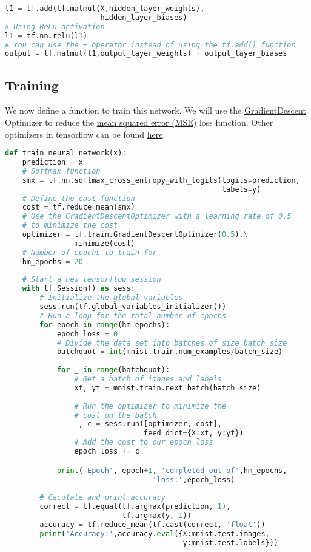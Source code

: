 \documentclass[Proceedings]{ascelike}
\begin{document}
\begin{lstlisting}[language=Python]
l1 = tf.add(tf.matmul(X,hidden_layer_weights), 
                      hidden_layer_biases)
# Using ReLu activation
l1 = tf.nn.relu(l1)
# You can use the + operator instead of using the tf.add() function
output = tf.matmul(l1,output_layer_weights) + output_layer_biases
\end{lstlisting}

\subsection{Training}
We now define a function to train this network. We will use the \href{https://en.wikipedia.org/wiki/Gradient_descent}{GradientDescent} Optimizer to reduce the \href{https://en.wikipedia.org/wiki/Mean_squared_error}{mean squared error (MSE)} loss function. Other optimizers in tensorflow can be found \href{https://www.tensorflow.org/api_guides/python/train#Optimizers}{here}.

\begin{lstlisting}[language=Python]
def train_neural_network(x):
    prediction = x
    # Softmax function
    smx = tf.nn.softmax_cross_entropy_with_logits(logits=prediction,
                                                  labels=y)
    # Define the cost function
    cost = tf.reduce_mean(smx)
    # Use the GradientDescentOptimizer with a learning rate of 0.5 
    # to minimize the cost
    optimizer = tf.train.GradientDescentOptimizer(0.5).\
                minimize(cost)
    # Number of epochs to train for
    hm_epochs = 20
    
    # Start a new tensorflow session
    with tf.Session() as sess:
        # Initialize the global variables
        sess.run(tf.global_variables_initializer())
        # Run a loop for the total number of epochs
        for epoch in range(hm_epochs):
            epoch_loss = 0
            # Divide the data set into batches of size batch_size
            batchquot = int(mnist.train.num_examples/batch_size)
            
            for _ in range(batchquot):
                # Get a batch of images and labels
                xt, yt = mnist.train.next_batch(batch_size)
                
                # Run the optimizer to minimize the 
                # cost on the batch
                _, c = sess.run([optimizer, cost], 
                                feed_dict={X:xt, y:yt})
                # Add the cost to our epoch loss
                epoch_loss += c

            print('Epoch', epoch+1, 'completed out of',hm_epochs,
                                  'loss:',epoch_loss)
        
        # Caculate and print accuracy
        correct = tf.equal(tf.argmax(prediction, 1), 
                           tf.argmax(y, 1))
        accuracy = tf.reduce_mean(tf.cast(correct, 'float'))
        print('Accuracy:',accuracy.eval({X:mnist.test.images, 
                                         y:mnist.test.labels}))
        
        
\end{lstlisting}
\end{document}
